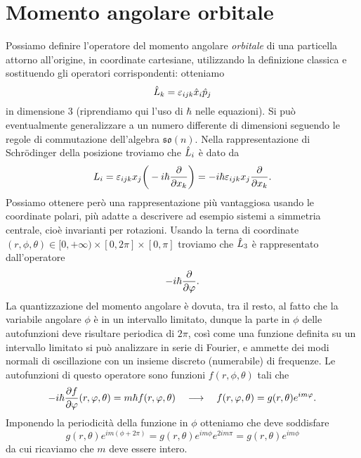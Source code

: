 \section{Momento angolare orbitale}
Possiamo definire l'operatore del momento angolare \emph{orbitale} di una particella attorno all'origine, in coordinate cartesiane, utilizzando la definizione classica e sostituendo gli operatori corrispondenti: otteniamo
\begin{equation}
	\hat{L}_k=\varepsilon_{ijk}\hat{x}_i\hat{p}_j
	\label{eq:momento-angolare-orbitale}
\end{equation}
in dimensione 3 (riprendiamo qui l'uso di $\hbar$ nelle equazioni).
Si può eventualmente generalizzare a un numero differente di dimensioni seguendo le regole di commutazione dell'algebra $\mathfrak{so}(n)$.
Nella rappresentazione di Schr\"odinger della posizione troviamo che $\hat{L}_i$ è dato da
\begin{equation}
	L_i=\varepsilon_{ijk}x_j\bigg(-i\hbar\frac{\partial {}}{\partial {x_k}}\bigg)=-i\hbar\varepsilon_{ijk}x_j\frac{\partial {}}{\partial {x_k}}.
\end{equation}
Possiamo ottenere però una rappresentazione più vantaggiosa usando le coordinate polari, più adatte a descrivere ad esempio sistemi a simmetria centrale, cioè invarianti per rotazioni.
Usando la terna di coordinate $(r,\phi,\theta)\in[0,+\infty)\times[0,2\pi]\times[0,\pi]$ troviamo che $\hat{L}_3$ è rappresentato dall'operatore
\begin{equation}
	-i\hbar\frac{\partial {}}{\partial {\varphi}}.
\end{equation}
La quantizzazione del momento angolare è dovuta, tra il resto, al fatto che la variabile angolare $\phi$ è in un intervallo limitato, dunque la parte in $\phi$ delle autofunzioni deve risultare periodica di $2\pi$, cos\`i come una funzione definita su un intervallo limitato si può analizzare in serie di Fourier, e ammette dei modi normali di oscillazione con un insieme discreto (numerabile) di frequenze.
Le autofunzioni di questo operatore sono funzioni $f(r,\phi,\theta)$ tali che
\begin{equation}
	-i\hbar\frac{\partial {f}}{\partial {\varphi}}(r,\varphi,\theta)=m\hbar f(r,\varphi,\theta)\quad\longrightarrow\quad f(r,\varphi,\theta)=g(r,\theta)e^{im\varphi}.
\end{equation}
Imponendo la periodicità della funzione in $\phi$ otteniamo che deve soddisfare
\begin{equation}
	g(r,\theta)e^{im(\phi+2\pi)}=g(r,\theta)e^{im\phi}e^{2im\pi}=g(r,\theta)e^{im\phi}
\end{equation}
da cui ricaviamo che $m$ deve essere intero.


